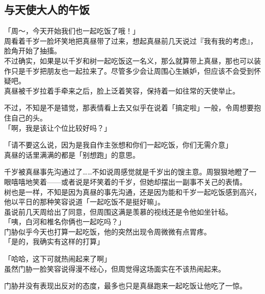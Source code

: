 \subsection{与天使大人的午饭}

「周～，今天开始我们也一起吃饭了哦！」\\

周看着千岁一脸坏笑地把真昼带了过来，想起真昼前几天说过『我有我的考虑』，脸角开始了抽搐。\\

不过确实，如果是以千岁和树一起吃饭这一名义，那么就算带上真昼，那也可以装作只是千岁把朋友也一起拉来了。尽管多少会让周围心生嫉妒，但应该不会受到怀疑吧。\\

真昼被千岁拉着手牵来之后，脸上泛着笑容，保持着一如往常的天使举止。

不过，不知是不是错觉，那表情看上去又似乎在说着「搞定啦」一般，令周想要抱住自己的头。\\

「啊，我是该让个位比较好吗？」

「请不要这么说，因为是我自作主张想和你们一起吃饭，你们无需介意」\\

真昼的话里满满的都是「别想跑」的意思。

千岁被真昼事先沟通过了……不如说周感觉就是千岁出的馊主意。周狠狠地瞪了一眼嘻嘻地笑着——或者说是坏笑着的千岁，但她却摆出一副事不关己的表情。\\

树也是一样，不知是因为真昼的事先沟通，还是因为能和千岁一起吃饭感到高兴，他以平日的那种笑容说道「一起吃饭不是挺好嘛」。\\

虽说前几天周给出了同意，但周围这满是羡慕的视线还是令他如坐针毡。\\

「咦，白河和椎名你俩也一起吃吗？」\\

门胁似乎今天也打算一起吃饭，他的突然出现令周微微有点胃疼。\\

「是的，我确实有这样的打算」

「哈哈，这下可就热闹起来了啊」\\

虽然门胁一脸笑容说得漫不经心，但周觉得这场面实在不该热闹起来。

门胁并没有表现出反对的态度，最多也只是真昼跑来一起吃饭让他吃了一惊。\\

